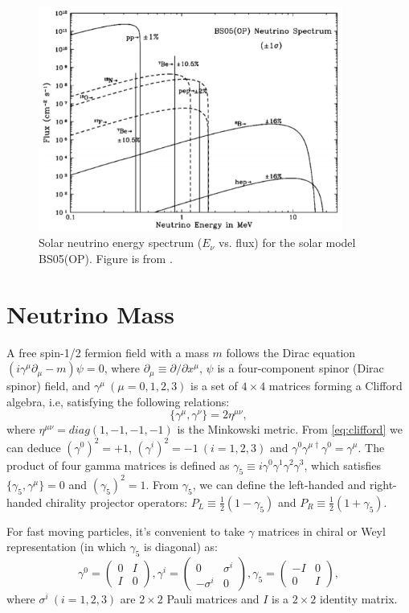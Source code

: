 \begin{figure}[htbp]
	\centering	
	\includegraphics[width=10cm]{BP05.pdf}
	\caption{ Solar neutrino energy spectrum ($E_\nu$ vs. flux) for the solar model BS05(OP). Figure is from \cite{bahcall2005new}.}
	\label{bp05plot}
\end{figure}

\section{Neutrino Mass}\label{section:Majorana}
A free spin-1/2 fermion field with a mass $m$ follows the Dirac equation $(i\gamma^\mu\partial_\mu-m)\psi=0$, where $\partial_\mu\equiv \partial/\partial x^\mu$, $\psi$ is a four-component spinor (Dirac spinor) field, and $\gamma^\mu~(\mu=0,1,2,3)$ is a set of $4\times 4$ matrices forming a Clifford algebra, i.e, satisfying the following relations\cite{akhmedov2014majorana,zee2010quantum}:
\begin{equation}\label{eq:clifford}
\{\gamma^\mu,\gamma^\nu\}=2\eta^{\mu\nu}, 
\end{equation}
where $\eta^{\mu\nu}=diag(1,-1,-1,-1)$ is the Minkowski metric. From \ref{eq:clifford} we can deduce $(\gamma^0)^2=+1$, $(\gamma^i)^2=-1~(i=1,2,3)$ and $\gamma^0\gamma^{\mu\dag}\gamma^0=\gamma^\mu$. The product of four gamma matrices is defined as $\gamma_5\equiv i\gamma^0\gamma^1\gamma^2\gamma^3$, which satisfies $\{\gamma_5,\gamma^\mu\}=0$ and $(\gamma_5)^2=1$. From $\gamma_5$, we can define the left-handed and right-handed chirality projector operators: $P_L\equiv\frac{1}{2}(1-\gamma_5)$ and $P_R\equiv\frac{1}{2}(1+\gamma_5)$.

For fast moving particles, it's convenient to take $\gamma$ matrices in chiral or Weyl representation (in which $\gamma_5$ is diagonal) as\cite{zee2010quantum}:
\begin{equation}
\gamma^0 = \begin{pmatrix} 
0 & I \\
I & 0
\end{pmatrix},
\gamma^i = \begin{pmatrix} 
0 & \sigma^i \\
-\sigma^i & 0
\end{pmatrix},
\gamma_5 = \begin{pmatrix} 
-I & 0 \\
0 & I
\end{pmatrix},
\end{equation}
where $\sigma^i~(i=1,2,3)$ are $2\times 2$ Pauli matrices and $I$ is a $2\times 2$ identity matrix.

